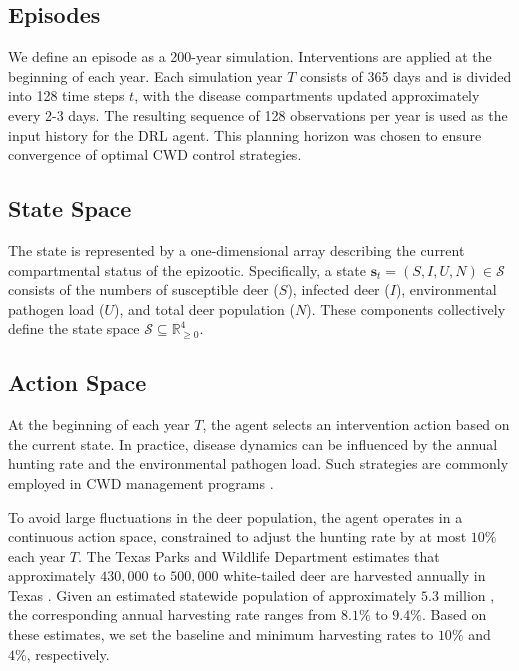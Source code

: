 \documentclass[12pt,a4paper,reqno]{amsart}
\theoremstyle{definition}
\theoremstyle{remark}
\theoremstyle{plain}
\begin{document}
\subsection{Episodes}

We define an episode as a 200-year simulation. Interventions are applied at the beginning of each year. Each simulation year $T$ consists of 365 days and is divided into 128 time steps $t$, with the disease compartments updated approximately every 2-3 days. The resulting sequence of 128 observations per year is used as the input history for the DRL agent. This planning horizon was chosen to ensure convergence of optimal CWD control strategies.

\subsection{State Space}

The state is represented by a one-dimensional array describing the current compartmental status of the epizootic. Specifically, a state $\mathbf{s}_t = (S, I, U, N) \in \mathcal{S}$ consists of the numbers of susceptible deer ($S$), infected deer ($I$), environmental pathogen load ($U$), and total deer population ($N$). These components collectively define the state space $\mathcal{S} \subseteq \mathbb{R}_{\geq 0}^{4}$.

\subsection{Action Space}

At the beginning of each year $T$, the agent selects an intervention action based on the current state. In practice, disease dynamics can be influenced by the annual hunting rate and the environmental pathogen load. Such strategies are commonly employed in CWD management programs \cite{AGFC_CWD}.

To avoid large fluctuations in the deer population, the agent operates in a continuous action space, constrained to adjust the hunting rate by at most $10\%$ each year $T$. The Texas Parks and Wildlife Department estimates that approximately $430,000$ to $500,000$ white-tailed deer are harvested annually in Texas \cite{TexasHarvestData}. Given an estimated statewide population of approximately $5.3$ million \cite{TPWDDeerPopulation}, the corresponding annual harvesting rate ranges from $8.1\%$ to $9.4\%$. Based on these estimates, we set the baseline and minimum harvesting rates to $10\%$ and $4\%$, respectively.
\end{document}
